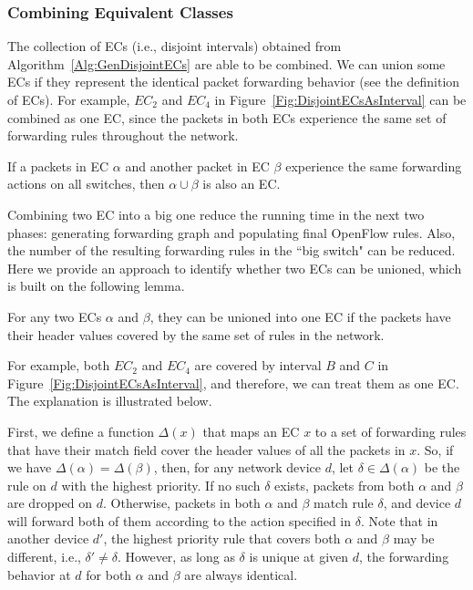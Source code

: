 \subsubsection{Combining Equivalent Classes}
The collection of ECs (i.e., disjoint intervals) obtained from Algorithm~\ref{Alg:GenDisjointECs} are able to be combined. 
We can union some ECs if they represent the identical packet forwarding behavior (see the definition of ECs). 
For example, $EC_2$ and $EC_4$ in Figure~\ref{Fig:DisjointECsAsInterval} can be combined as one EC, since the packets in both ECs experience the same set of forwarding rules throughout the network. %

\begin{lemma}
If a packets in EC $\alpha$ and another packet in EC $\beta$ experience the same forwarding actions on all switches, then $\alpha \cup \beta$ is also an EC.
\label{Lemma:MergeFG}
\end{lemma}
Combining two EC into a big one reduce the running time in the next two phases: generating forwarding graph and populating final OpenFlow rules. Also, the number of the resulting forwarding rules in the ``big switch" can be reduced. Here we provide an approach to identify whether two ECs can be unioned, which is built on the following lemma.

\begin{lemma}
For any two ECs $\alpha$ and $\beta$, they can be unioned into one EC if the packets have their header values covered by the same set of rules in the network.
\label{Lemma:MergeEC}
\end{lemma}
For example, both $EC_2$ and $EC_4$ are covered by interval $B$ and $C$ in Figure~\ref{Fig:DisjointECsAsInterval}, and therefore, we can treat them as one EC. The explanation is illustrated below.

First, we define a function $\Delta(x)$ that maps an EC $x$ to a set of forwarding rules that have their match field cover the header values of all the packets in $x$. So, if we have $\Delta(\alpha) = \Delta(\beta)$, then, 
for any network device $d$, let $\delta \in \Delta(\alpha)$ be the rule on $d$ with the highest priority.
If no such $\delta$ exists, packets from both $\alpha$ and $\beta$ are dropped on $d$.
Otherwise, packets in both $\alpha$ and $\beta$ match rule $\delta$, and
device $d$ will forward both of them according to the action specified in $\delta$.
Note that in another device $d'$, the highest priority rule that covers both $\alpha$
and $\beta$ may be different, i.e., $\delta' \neq \delta$.
However, as long as $\delta$ is unique at given $d$, the forwarding behavior at $d$ for both $\alpha$ and $\beta$ are always identical.

